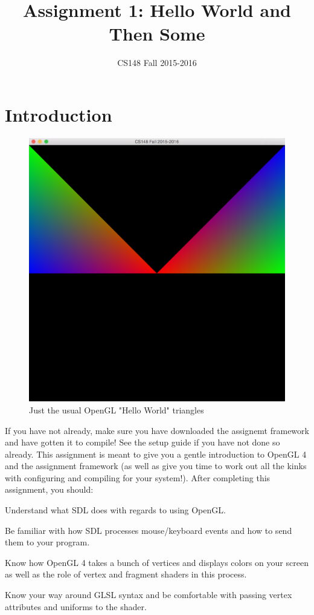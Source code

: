 \documentclass{article}
\begin{document}
\title{Assignment 1: Hello World and Then Some}
\author{CS148 Fall 2015-2016}
\date{}
\maketitle

\section*{Introduction}

\begin{figure}[h!]
    \centering\includegraphics[width=0.5\linewidth]{assign1.png}
    \caption{Just the usual OpenGL "Hello World" triangles}
\end{figure}

If you have not already, make sure you have downloaded the assignemt framework and have gotten it to compile! See the setup guide if you have not done so already. This assignment is meant to give you a gentle introduction to OpenGL 4 and the assignment framework (as well as give you time to work out all the kinks with configuring and compiling for your system!). After completing this assignment, you should:

\begin{enumerate*}
    \item Understand what SDL does with regards to using OpenGL.
    \item Be familiar with how SDL processes mouse/keyboard events and how to send them to your program.
    \item Know how OpenGL 4 takes a bunch of vertices and displays colors on your screen as well as the role of vertex and fragment shaders in this process.
    \item Know your way around GLSL syntax and be comfortable with passing vertex attributes and uniforms to the shader.
\end{enumerate*}
\end{document}
